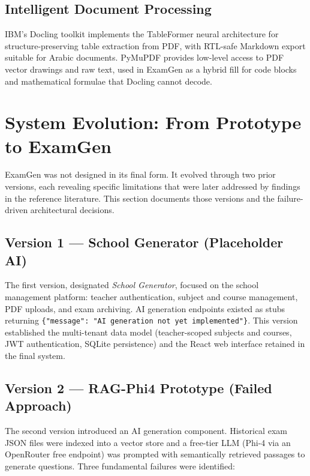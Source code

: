 \documentclass[12pt, a4paper]{article}
\begin{document}
\subsection{Intelligent Document Processing}

IBM's Docling toolkit \cite{docling2024} implements the TableFormer neural
architecture for structure-preserving table extraction from PDF, with RTL-safe
Markdown export suitable for Arabic documents. PyMuPDF \cite{pymupdf2023} provides
low-level access to PDF vector drawings and raw text, used in ExamGen as a hybrid
fill for code blocks and mathematical formulae that Docling cannot decode.

\section{System Evolution: From Prototype to ExamGen}
\label{sec:evolution}

ExamGen was not designed in its final form. It evolved through two prior versions,
each revealing specific limitations that were later addressed by findings in the
reference literature. This section documents those versions and the failure-driven
architectural decisions.

\subsection{Version 1 --- School Generator (Placeholder AI)}

The first version, designated \textit{School Generator}, focused on the school
management platform: teacher authentication, subject and course management, PDF
uploads, and exam archiving. AI generation endpoints existed as stubs returning
\texttt{\{"message": "AI generation not yet implemented"\}}. This version established
the multi-tenant data model (teacher-scoped subjects and courses, JWT authentication,
SQLite persistence) and the React web interface retained in the final system.

\subsection{Version 2 --- RAG-Phi4 Prototype (Failed Approach)}

The second version introduced an AI generation component. Historical exam JSON files
were indexed into a vector store and a free-tier LLM (Phi-4 via an OpenRouter free
endpoint) was prompted with semantically retrieved passages to generate questions.
Three fundamental failures were identified:
\end{document}
